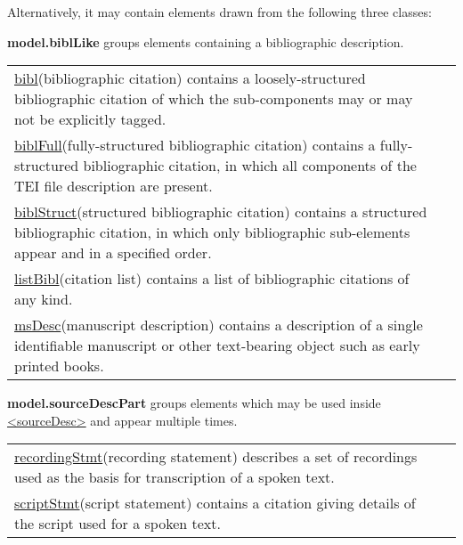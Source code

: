 Alternatively, it may contain elements drawn from the following three classes: 
\begin{sansreflist}
  
\item [\textbf{model.biblLike}] groups elements containing a bibliographic description. \par 
\begin{longtable}{P{0.1619538834951456\textwidth}P{0.6880461165048544\textwidth}}
\hyperref[TEI.bibl]{bibl}\tabcellsep (bibliographic citation) contains a loosely-structured bibliographic citation of which the sub-components may or may not be explicitly tagged.\\
\hyperref[TEI.biblFull]{biblFull}\tabcellsep (fully-structured bibliographic citation) contains a fully-structured bibliographic citation, in which all components of the TEI file description are present.\\
\hyperref[TEI.biblStruct]{biblStruct}\tabcellsep (structured bibliographic citation) contains a structured bibliographic citation, in which only bibliographic sub-elements appear and in a specified order.\\
\hyperref[TEI.listBibl]{listBibl}\tabcellsep (citation list) contains a list of bibliographic citations of any kind.\\
\hyperref[TEI.msDesc]{msDesc}\tabcellsep (manuscript description) contains a description of a single identifiable manuscript or other text-bearing object such as early printed books.\end{longtable} \par
 
\item [\textbf{model.sourceDescPart}] groups elements which may be used inside \hyperref[TEI.sourceDesc]{<sourceDesc>} and appear multiple times. \par 
\begin{longtable}{P{0.2463768115942029\textwidth}P{0.6036231884057971\textwidth}}
\hyperref[TEI.recordingStmt]{recordingStmt}\tabcellsep (recording statement) describes a set of recordings used as the basis for transcription of a spoken text.\\
\hyperref[TEI.scriptStmt]{scriptStmt}\tabcellsep (script statement) contains a citation giving details of the script used for a spoken text.\end{longtable} \par
 

\end{sansreflist}
